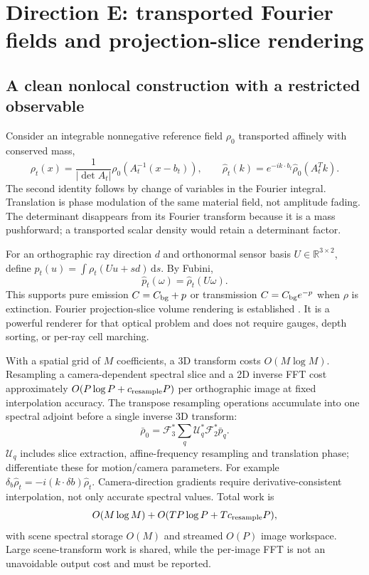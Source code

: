 \documentclass[10pt,letterpaper]{article}
\theoremstyle{remark}\newtheorem{counterexample}[proposition]{Counterexample}
\newcommand{\R}{\mathbb R}
\newcommand{\dd}{\,\mathrm d}
\begin{document}
\section{Direction E: transported Fourier fields and projection-slice rendering}

\subsection{A clean nonlocal construction with a restricted observable}
Consider an integrable nonnegative reference field $\rho_0$ transported affinely with conserved mass,
\begin{equation}
 \rho_t(x)=\frac{1}{|\det A_t|}\rho_0(A_t^{-1}(x-b_t)),\qquad
 \widehat\rho_t(k)=e^{-ik\cdot b_t}\widehat\rho_0(A_t^Tk). \label{eq:fouriermove}
\end{equation}
The second identity follows by change of variables in the Fourier integral. Translation is phase modulation of the same material field, not amplitude fading. The determinant disappears from its Fourier transform because it is a mass pushforward; a transported scalar density would retain a determinant factor.

For an orthographic ray direction $d$ and orthonormal sensor basis $U\in\R^{3\times2}$, define $p_t(u)=\int\rho_t(Uu+sd)\dd s$. By Fubini,
\begin{equation}
 \widehat p_t(\omega)=\widehat\rho_t(U\omega). \label{eq:slice}
\end{equation}
This supports pure emission $C=C_{\rm bg}+p$ or transmission $C=C_{\rm bg}e^{-p}$ when $\rho$ is extinction. Fourier projection-slice volume rendering is established \cite{fourier}. It is a powerful renderer for that optical problem and does not require gauges, depth sorting, or per-ray cell marching.

With a spatial grid of $M$ coefficients, a 3D transform costs $O(M\log M)$. Resampling a camera-dependent spectral slice and a 2D inverse FFT cost approximately $O(P\log P+c_{\rm resample}P)$ per orthographic image at fixed interpolation accuracy. The transpose resampling operations accumulate into one spectral adjoint before a single inverse 3D transform:
\begin{equation}
 \bar\rho_0=\mathcal F_3^*\sum_q\mathcal U_q^*\mathcal F_2^*\bar p_q. \label{eq:fourieradj}
\end{equation}
$\mathcal U_q$ includes slice extraction, affine-frequency resampling and translation phase; differentiate these for motion/camera parameters. For example $\delta_b\widehat\rho_t=-i(k\cdot\delta b)\widehat\rho_t$. Camera-direction gradients require derivative-consistent interpolation, not only accurate spectral values. Total work is
\begin{equation}
 O(M\log M)+O(TP\log P+Tc_{\rm resample}P),
\end{equation}
with scene spectral storage $O(M)$ and streamed $O(P)$ image workspace. Large scene-transform work is shared, while the per-image FFT is not an unavoidable output cost and must be reported.
\end{document}
